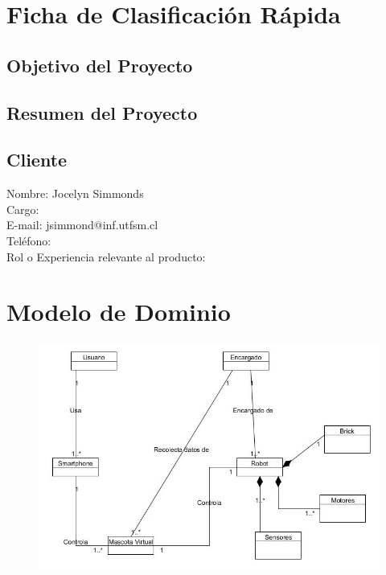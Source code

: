 \documentclass[letterpaper,12pt]{article} %
\numberwithin{equation}{section} %
\numberwithin{figure}{section} %
\numberwithin{table}{section} %
\begin{document}
\setcounter{page}{1} %

\tableofcontents
\newpage

\section{Ficha de Clasificaci\'on R\'apida}
\subsection{Objetivo del Proyecto} %
\subsection{Resumen del Proyecto} %
\subsection{Cliente}
Nombre: Jocelyn Simmonds\\
Cargo: \\
E-mail: jsimmond@inf.utfsm.cl\\
Tel\'efono: \\
Rol o Experiencia relevante al producto:

\newpage
\section{Modelo de Dominio}

\begin{figure}
   \centering
     \includegraphics[scale=0.5]{ModeloDominio.jpg}
   \caption{}
   \label{fig:ModeloDominio}
\end{figure}
\end{document}
